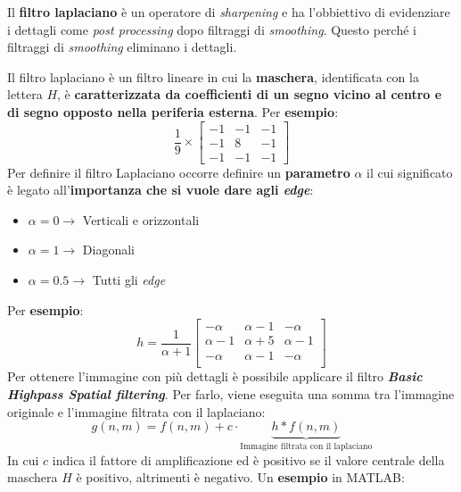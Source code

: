 \documentclass[a4paper]{article}
\begin{document}
	Il \textcolor{Red3}{\textbf{filtro laplaciano}} è un operatore di \emph{sharpening} e ha l'obbiettivo di evidenziare i dettagli come \emph{post processing} dopo filtraggi di \emph{smoothing}. Questo perché i filtraggi di \emph{smoothing} eliminano i dettagli.\newline
	
	\noindent
	Il filtro laplaciano è un filtro lineare in cui la \textbf{maschera}, identificata con la lettera $H$, è \textbf{caratterizzata da coefficienti di un segno vicino al centro e di segno opposto nella periferia esterna}. Per \textcolor{Green4}{\textbf{esempio}}:
	\begin{equation*}
		\dfrac{1}{9} \times
		\begin{bmatrix}
			-1 & -1 & -1 \\
			-1 & 8 & -1 \\
			-1 & -1 & -1
		\end{bmatrix}
	\end{equation*}
	Per definire il filtro Laplaciano occorre definire un \textbf{parametro} $\alpha$ il cui significato è legato all'\textbf{importanza che si vuole dare agli \emph{edge}}:
	\begin{itemize}
		\item $\alpha = 0 \longrightarrow$ Verticali e orizzontali
		
		\item $\alpha = 1 \longrightarrow$ Diagonali
		
		\item $\alpha = 0.5 \longrightarrow$ Tutti gli \emph{edge}
	\end{itemize}
	Per \textcolor{Green4}{\textbf{esempio}}:
	\begin{equation*}
		h = \dfrac{1}{\alpha+1} 
		\begin{bmatrix}
			-\alpha & \alpha-1 & -\alpha \\
			\alpha-1 & \alpha+5 & \alpha-1 \\
			-\alpha & \alpha-1 & -\alpha \\
		\end{bmatrix}
	\end{equation*}
	Per ottenere l'immagine con più dettagli è possibile applicare il filtro \emph{\textbf{Basic Highpass Spatial filtering}}. Per farlo, viene eseguita una somma tra l'immagine originale e l'immagine filtrata con il laplaciano:
	\begin{equation*}
		g\left(n,m\right) = f\left(n,m\right) + c \cdot \underbrace{h * f \left(n,m\right)}_{\text{Immagine filtrata con il laplaciano}}
	\end{equation*}
	In cui $c$ indica il fattore di amplificazione ed è positivo se il valore centrale della maschera $H$ è positivo, altrimenti è negativo. Un \textcolor{Green4}{\textbf{esempio}} in MATLAB:
	\newpage
	
\end{document}
